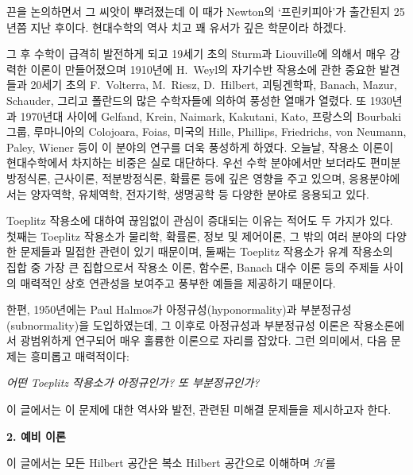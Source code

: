 \documentclass[12pt,a4paper,2sided]{article}
\begin{document}
\noindent 끈을 논의하면서 그 씨앗이 뿌려졌는데 이 때가 Newton의
`프린키피아'가 출간된지 25년쯤 지난 후이다. 현대수학의 역사 치고 꽤
유서가 깊은 학문이라 하겠다.

  그 후 수학이 급격히 발전하게 되고 19세기 초의
Sturm과 Liouville에 의해서 매우 강력한 이론이 만들어졌으며 1910년에
H.\ Weyl의 자기수반 작용소에 관한 중요한 발견들과 20세기 초의 F.\
Volterra, M.\ Riesz, D.\ Hilbert, 괴팅겐학파, Banach, Mazur,
Schauder, 그리고 폴란드의 많은 수학자들에 의하여 풍성한 열매가
열렸다. 또 1930년과 1970년대 사이에 Gelfand, Krein, Naimark,
Kakutani, Kato, 프랑스의 Bourbaki 그룹, 루마니아의 Colojoara, Foias,
미국의 Hille, Phillips, Friedrichs, von Neumann, Paley, Wiener 등이
이 분야의 연구를 더욱 풍성하게 하였다. 오늘날, 작용소 이론이
현대수학에서 차지하는 비중은 실로 대단하다. 우선 수학 분야에서만
보더라도 편미분방정식론, 근사이론, 적분방정식론, 확률론 등에 깊은
영향을 주고 있으며, 응용분야에서는 양자역학, 유체역학, 전자기학,
생명공학 등 다양한 분야로 응용되고 있다.

Toeplitz 작용소에 대하여 끊임없이 관심이 증대되는 이유는 적어도 두
가지가 있다. 첫째는 Toeplitz 작용소가 물리학, 확률론, 정보 및
제어이론, 그 밖의 여러 분야의 다양한 문제들과 밀접한 관련이 있기
때문이며, 둘째는 Toeplitz 작용소가 유계 작용소의 집합 중 가장 큰
집합으로서 작용소 이론, 함수론, Banach 대수 이론 등의 주제들 사이의
매력적인 상호 연관성을 보여주고 풍부한 예들을 제공하기 때문이다.

한편, 1950년에는 Paul Halmos가 아정규성(hyponormality)과
부분정규성\newline\noindent(subnormality)을 도입하였는데, 그 이후로
아정규성과 부분정규성 이론은 작용소론에서 광범위하게 연구되어 매우
훌륭한 이론으로 자리를 잡았다. 그런 의미에서, 다음 문제는 흥미롭고
매력적이다:

\vspace{.2 cm}\centerline {\it 어떤 Toeplitz 작용소가 아정규인가? 또
부분정규인가?}\vspace{.2 cm}

이 글에서는 이 문제에 대한 역사와 발전, 관련된 미해결 문제들을
제시하고자 한다.



\vspace{.8 cm} {\large\bf 2. 예비 이론}

\vspace{.5 cm}

이  글에서는 모든 Hilbert 공간은 복소 Hilbert 공간으로 이해하며
$\mathcal{H}$를\linebreak
\end{document}
